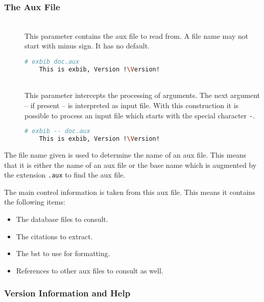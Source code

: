 \subsubsection{The Aux File}

\begin{description}
\item[]\ \\
  This parameter contains the aux file to read from. A file name may not
  start with minus sign. It has no default.
  \begin{lstlisting}[language=sh,escapechar=!]
    # exbib doc.aux
    This is exbib, Version !\Version!
  \end{lstlisting}
  
\item[\cli{-} ]
\item[\cli{-{}-} ]\ \\
  This parameter intercepts the processing of arguments. The next
  argument -- if present -- is interpreted as input file. With this
  construction it is possible to process an input file which starts
  with the special character \verb|-|.
  \begin{lstlisting}[language=sh,escapechar=!]
    # exbib -- doc.aux
    This is exbib, Version !\Version!
  \end{lstlisting}

\end{description}

The file name given is used to determine the name of an aux file. This
means that it is either the name of an aux file or the base name which
is augmented by the extension \texttt{.aux} to find the aux file.

The main control information is taken from this aux file. This means
it contains the following items:

\begin{itemize}
\item The database files to consult.
\item The citations to extract.
\item The bst to use for formatting.
\item References to other aux files to consult as well.
\end{itemize}

\subsubsection{Version Information and Help}

